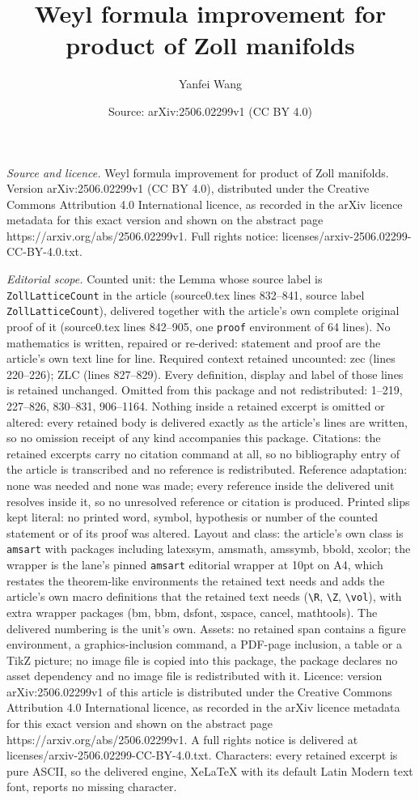 \documentclass[10pt,a4paper]{amsart}
\title[Weyl formula improvement for product of Zoll manifolds]{Weyl formula improvement for product of Zoll manifolds}
\author{Yanfei Wang}
\date{Source: arXiv:2506.02299v1 (CC BY 4.0)}
\begin{document}
\maketitle

\noindent\emph{Source and licence.} Weyl formula improvement for product of Zoll manifolds. Version arXiv:2506.02299v1 (CC BY 4.0), distributed under the Creative Commons Attribution 4.0 International licence, as recorded in the arXiv licence metadata for this exact version and shown on the abstract page https://arxiv.org/abs/2506.02299v1. Full rights notice: licenses/arxiv-2506.02299-CC-BY-4.0.txt.\par\smallskip

\noindent\textit{Editorial scope.} Counted unit: the Lemma whose source label is \texttt{ZollLatticeCount} in the article (source0.tex lines 832--841, source label \texttt{ZollLatticeCount}), delivered together with the article's own complete original proof of it (source0.tex lines 842--905, one \texttt{proof} environment of 64 lines). No mathematics is written, repaired or re-derived: statement and proof are the article's own text line for line. Required context retained uncounted: zec (lines 220--226); ZLC (lines 827--829). Every definition, display and label of those lines is retained unchanged. Omitted from this package and not redistributed: 1--219, 227--826, 830--831, 906--1164. Nothing inside a retained excerpt is omitted or altered: every retained body is delivered exactly as the article's lines are written, so no omission receipt of any kind accompanies this package. Citations: the retained excerpts carry no citation command at all, so no bibliography entry of the article is transcribed and no reference is redistributed. Reference adaptation: none was needed and none was made; every reference inside the delivered unit resolves inside it, so no unresolved reference or citation is produced. Printed slips kept literal: no printed word, symbol, hypothesis or number of the counted statement or of its proof was altered. Layout and class: the article's own class is \texttt{amsart} with packages including latexsym, amsmath, amssymb, bbold, xcolor; the wrapper is the lane's pinned \texttt{amsart} editorial wrapper at 10pt on A4, which restates the theorem-like environments the retained text needs and adds the article's own macro definitions that the retained text needs (\texttt{\textbackslash R}, \texttt{\textbackslash Z}, \texttt{\textbackslash vol}), with extra wrapper packages (bm, bbm, dsfont, xspace, cancel, mathtools). The delivered numbering is the unit's own. Assets: no retained span contains a figure environment, a graphics-inclusion command, a PDF-page inclusion, a table or a TikZ picture; no image file is copied into this package, the package declares no asset dependency and no image file is redistributed with it. Licence: version arXiv:2506.02299v1 of this article is distributed under the Creative Commons Attribution 4.0 International licence, as recorded in the arXiv licence metadata for this exact version and shown on the abstract page https://arxiv.org/abs/2506.02299v1. A full rights notice is delivered at licenses/arxiv-2506.02299-CC-BY-4.0.txt. Characters: every retained excerpt is pure ASCII, so the delivered engine, XeLaTeX with its default Latin Modern text font, reports no missing character.
\end{document}
